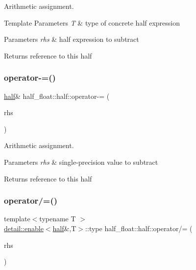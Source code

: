 Arithmetic assignment. 
\begin{DoxyTemplParams}{Template Parameters}
{\em T} & type of concrete half expression \\
\hline
\end{DoxyTemplParams}

\begin{DoxyParams}{Parameters}
{\em rhs} & half expression to subtract \\
\hline
\end{DoxyParams}
\begin{DoxyReturn}{Returns}
reference to this half 
\end{DoxyReturn}
\mbox{\label{classhalf__float_1_1half_a394f8eec9a67b4577584f994c7c3cb90}} 
\subsubsection{\texorpdfstring{operator-\/=()}{operator-=()}\hspace{0.1cm}{\footnotesize\ttfamily [2/2]}}
{\footnotesize\ttfamily \hyperlink{classhalf__float_1_1half}{half}\& half\+\_\+float\+::half\+::operator-\/= (\begin{DoxyParamCaption}\item[{float}]{rhs }\end{DoxyParamCaption})\hspace{0.3cm}{\ttfamily [inline]}}

Arithmetic assignment. 
\begin{DoxyParams}{Parameters}
{\em rhs} & single-\/precision value to subtract \\
\hline
\end{DoxyParams}
\begin{DoxyReturn}{Returns}
reference to this half 
\end{DoxyReturn}
\mbox{\label{classhalf__float_1_1half_a7a3a8659d8186e9cb14638907c664aa9}} 
\subsubsection{\texorpdfstring{operator/=()}{operator/=()}\hspace{0.1cm}{\footnotesize\ttfamily [1/2]}}
{\footnotesize\ttfamily template$<$typename T $>$ \\
\hyperlink{structhalf__float_1_1detail_1_1enable}{detail\+::enable}$<$\hyperlink{classhalf__float_1_1half}{half}\&,T$>$\+::type half\+\_\+float\+::half\+::operator/= (\begin{DoxyParamCaption}\item[{T}]{rhs }\end{DoxyParamCaption})\hspace{0.3cm}{\ttfamily [inline]}}

